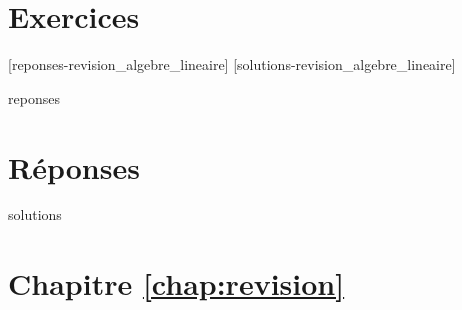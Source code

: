 \section{Exercices}
\label{chap:revision:exercices}


[reponses-revision_algebre_lineaire]
[solutions-revision_algebre_lineaire]

\begin{Filesave}{reponses}
\bigskip
\section*{Réponses}

\end{Filesave}

\begin{Filesave}{solutions}
\section*{Chapitre \ref{chap:revision}}

\end{Filesave}



